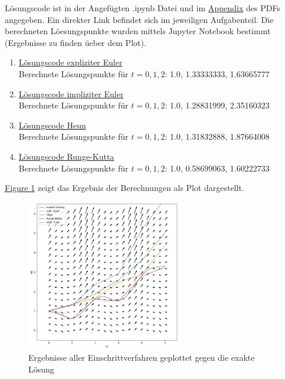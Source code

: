 \documentclass[german]{uebung}
\begin{document}
\begin{exercise}{2}
	L\"osungscode ist in der Angef\"ugten .ipynb Datei und im \hyperref[lab:ap]{Appendix}
	des PDFs angegeben. Ein direkter Link befindet sich im jeweiligen
	Aufgabenteil. Die berechneten L\"oesungspunkte wurden mittels Jupyter
	Notebook bestimmt (Ergebnisse zu finden \"ueber dem Plot).
	\begin{enumerate}[label=(\alph*)]
		\item \hyperref[codeA]{L\"osungscode expliziter Euler}\\
			Berechnete L\"osungspunkte f\"ur $t = 0, 1, 2$: 1.0, 1.33333333, 1.63665777
		\item \hyperref[codeB]{L\"osungscode impliziter Euler}\\
			Berechnete L\"osungspunkte f\"ur $t = 0, 1, 2$: 1.0, 1.28831999, 2.35160323
		\item \hyperref[codeC]{L\"osungscode Heun}\\
			Berechnete L\"osungspunkte f\"ur $t = 0, 1, 2$: 1.0, 1.31832888, 1.87664008
		\item \hyperref[codeD]{L\"osungscode Runge-Kutta}\\
			Berechnete L\"osungspunkte f\"ur $t = 0, 1, 2$: 1.0, 0.58699063, 1.60222733
	\end{enumerate}

	\hyperref[fig:1]{Figure 1} zeigt das Ergebnis der Berechnungen als Plot dargestellt.
	\begin{figure}[h]
		\centering
		\includegraphics[width=0.6\textwidth]{plot.png}
		\caption{Ergebnisse aller Einschrittverfahren geplottet gegen
			die exakte L\"osung}
		\label{fig:1}
	\end{figure}
\end{exercise}
\end{document}
